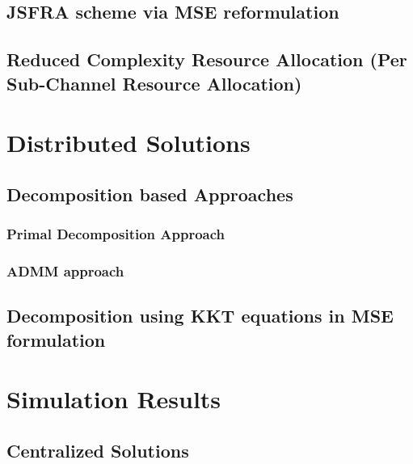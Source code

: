 \documentclass[11pt,draftcls,onecolumn,letterpaper]{./../Styles/IEEEtran}
\begin{document}
\subsection{\ac{JSFRA} scheme via MSE reformulation} \label{sec-3.3}


\subsection{Reduced Complexity Resource Allocation (Per Sub-Channel Resource Allocation)} \label{sec-3.4}


\section{Distributed Solutions} \label{sec-4}



\subsection{Decomposition based Approaches}

\subsubsection{Primal Decomposition Approach} \label{sec-4.1}


%

\subsubsection{\ac{ADMM} approach} \label{sec-4.2}


%

\subsection{Decomposition using \ac{KKT} equations in \ac{MSE} formulation} \label{sec-4.3}



\section{Simulation Results} \label{sec-5}


\subsection{Centralized Solutions}

\end{document}
